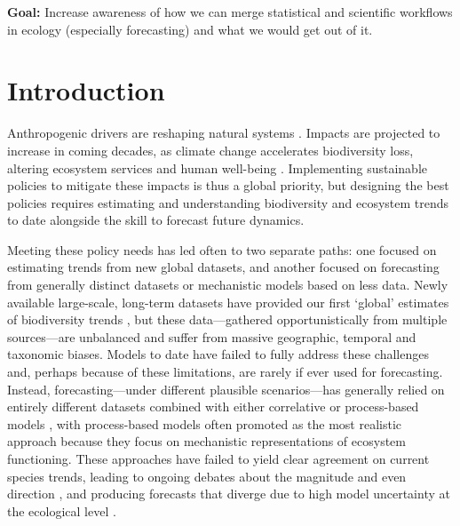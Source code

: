 \documentclass[11pt]{article}
\begin{document}
{\noindent \bf Goal:} Increase awareness of how we can merge statistical and scientific workflows in ecology (especially forecasting) and what we would get out of it.
\vspace*{0.5cm}

\section{Introduction}

Anthropogenic drivers are reshaping natural systems \citep{Diaz2019}. Impacts are projected to increase in coming decades, as climate change accelerates biodiversity loss, altering ecosystem services and human well-being \citep{IPBES2019}. %
Implementing sustainable policies to mitigate these impacts is thus a global priority, but designing the best policies requires estimating and understanding biodiversity and ecosystem trends to date alongside the skill to forecast future dynamics. %

Meeting these policy needs has led often to two separate paths: one focused on estimating trends from new global datasets, and another focused on forecasting from generally distinct datasets or mechanistic models based on less data. Newly available large-scale, long-term datasets have provided our first `global' estimates of biodiversity trends \citep[e.g.][]{loh2005living,Dornelas2018}, but these data---gathered opportunistically from multiple sources---are unbalanced and suffer from massive geographic, temporal and taxonomic biases. Models to date have failed to fully address these challenges and, perhaps because of these limitations, are rarely if ever used for forecasting.
Instead, forecasting---under different plausible scenarios---has generally relied on entirely different datasets combined with either correlative or process-based models \citep{IPBES2019}, with process-based models often promoted as the most realistic approach \citep{Urban2016, Pilowsky2022} because they focus on mechanistic representations of ecosystem functioning. These approaches have failed to yield clear agreement on current species trends, leading to ongoing debates about the magnitude and even direction \citep{Dornelas2014, Leung2020, Buschke2021, Johnson2024}, and producing forecasts that diverge due to high model uncertainty at the ecological level \citep{Cheaib2012}.
\end{document}
